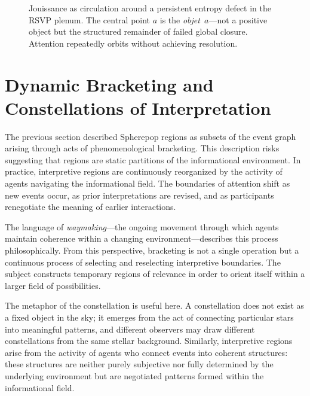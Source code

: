 \documentclass[12pt,a4paper]{article}
\begin{document}
\begin{figure}[H]
\centering
{}
\caption{Jouissance as circulation around a persistent entropy defect in the RSVP plenum. The
central point $a$ is the \emph{objet~$a$}---not a positive object but the structured remainder
of failed global closure. Attention repeatedly orbits without achieving resolution.}
\label{fig:jouissance-defect}
\end{figure}

\section{Dynamic Bracketing and Constellations of Interpretation}

The previous section described Spherepop regions as subsets of the event graph arising through
acts of phenomenological bracketing. This description risks suggesting that regions are static
partitions of the informational environment. In practice, interpretive regions are continuously
reorganized by the activity of agents navigating the informational field. The boundaries of
attention shift as new events occur, as prior interpretations are revised, and as participants
renegotiate the meaning of earlier interactions.

The language of \emph{waymaking}---the ongoing movement through which agents maintain
coherence within a changing environment---describes this process philosophically. From this
perspective, bracketing is not a single operation but a continuous process of selecting and
reselecting interpretive boundaries. The subject constructs temporary regions of relevance in
order to orient itself within a larger field of possibilities.

The metaphor of the constellation is useful here. A constellation does not exist as a fixed
object in the sky; it emerges from the act of connecting particular stars into meaningful
patterns, and different observers may draw different constellations from the same stellar
background. Similarly, interpretive regions arise from the activity of agents who connect
events into coherent structures: these structures are neither purely subjective nor fully
determined by the underlying environment but are negotiated patterns formed within the
informational field.
\end{document}
